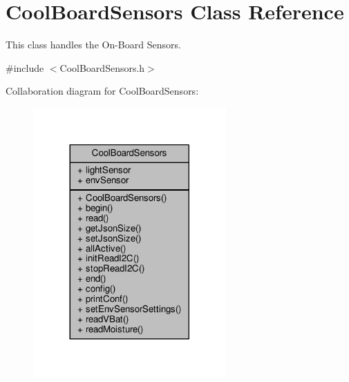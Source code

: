 \hypertarget{class_cool_board_sensors}{}\section{Cool\+Board\+Sensors Class Reference}
\label{class_cool_board_sensors}


This class handles the On-\/\+Board Sensors.  




{\ttfamily \#include $<$Cool\+Board\+Sensors.\+h$>$}



Collaboration diagram for Cool\+Board\+Sensors\+:
\nopagebreak
\begin{figure}[H]
\begin{center}
\leavevmode
\includegraphics[width=209pt]{class_cool_board_sensors__coll__graph}
\end{center}
\end{figure}
